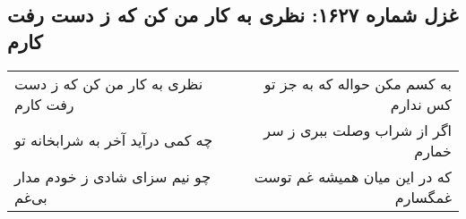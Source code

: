 \begin{center}
\section*{غزل شماره ۱۶۲۷: نظری به کار من کن که ز دست رفت کارم}
\label{sec:1627}
\begin{longtable}{l p{0.5cm} r}
نظری به کار من کن که ز دست رفت کارم
&&
به کسم مکن حواله که به جز تو کس ندارم
\\
چه کمی درآید آخر به شرابخانه تو
&&
اگر از شراب وصلت ببری ز سر خمارم
\\
چو نیم سزای شادی ز خودم مدار بی‌غم
&&
که در این میان همیشه غم توست غمگسارم
\\
\end{longtable}
\end{center}
